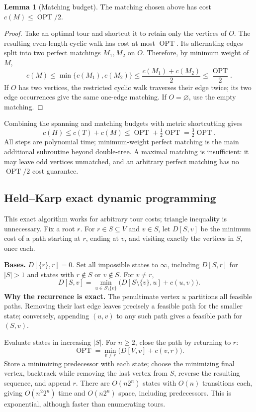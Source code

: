 \documentclass[10pt]{article}
\theoremstyle{definition}
\newtheorem{lemma}[definition]{Lemma}
\newcommand{\OPT}{\operatorname{OPT}}
\begin{document}
\begin{lemma}[Matching budget]
The matching chosen above has cost $c(M)\le\OPT/2$.
\end{lemma}
\begin{proof}
Take an optimal tour and shortcut it to retain only the vertices of $O$.
The resulting even-length cyclic walk has cost at most $\OPT$.  Its
alternating edges split into two perfect matchings $M_1,M_2$ on $O$.
Therefore, by minimum weight of $M$,
\[
c(M)\le\min\{c(M_1),c(M_2)\}
\le\frac{c(M_1)+c(M_2)}2\le\frac{\OPT}2.
\]
If $O$ has two vertices, the restricted cyclic walk traverses their edge
twice; its two edge occurrences give the same one-edge matching.  If
$O=\varnothing$, use the empty matching.
\end{proof}
Combining the spanning and matching budgets with metric shortcutting gives
\[
\boxed{\ c(H)\le c(T)+c(M)\le\OPT+\tfrac12\OPT
       =\tfrac32\OPT.\ }
\]
All steps are polynomial time; minimum-weight perfect matching is the main
additional subroutine beyond double-tree.  A maximal matching is insufficient:
it may leave odd vertices unmatched, and an arbitrary perfect matching has
no $\OPT/2$ cost guarantee.

\subsection{Held--Karp exact dynamic programming}\label{tsp:heldkarp}
This exact algorithm works for arbitrary tour costs; triangle inequality
is unnecessary.  Fix a root $r$.  For $r\in S\subseteq V$ and $v\in S$,
let $D[S,v]$ be the minimum cost of a path starting at $r$, ending at $v$,
and visiting exactly the vertices in $S$, once each.

\textbf{Bases.} $D[\{r\},r]=0$.  Set all impossible states to $\infty$,
including $D[S,r]$ for $|S|>1$ and states with $r\notin S$ or $v\notin S$.
For $v\ne r$,
\[
\boxed{\ D[S,v]=\min_{u\in S\setminus\{v\}}
        \bigl(D[S\setminus\{v\},u]+c(u,v)\bigr).\ }
\]
\textbf{Why the recurrence is exact.} The penultimate vertex $u$ partitions
all feasible paths.  Removing their last edge leaves precisely a feasible
path for the smaller state; conversely, appending $(u,v)$ to any such path
gives a feasible path for $(S,v)$.

Evaluate states in increasing $|S|$.  For $n\ge2$, close the path by returning
to $r$:
\[
\OPT=\min_{v\ne r}\bigl(D[V,v]+c(v,r)\bigr).
\]
Store a minimizing predecessor with each state; choose the minimizing final
vertex, backtrack while removing the last vertex from $S$, reverse the
resulting sequence, and append $r$.  There are $O(n2^n)$ states with $O(n)$
transitions each, giving $O(n^2 2^n)$ time and $O(n2^n)$ space, including
predecessors.  This is exponential, although faster than enumerating tours.
\end{document}
